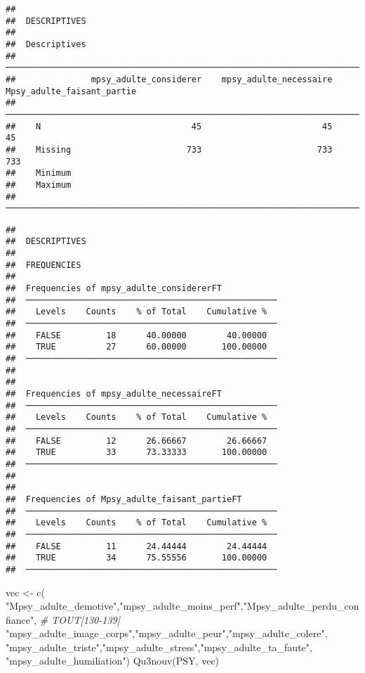 \documentclass[
]{article}
\newenvironment{Shaded}{\begin{snugshade}}{\end{snugshade}}
\newcommand{\CommentTok}[1]{\textcolor[rgb]{0.56,0.35,0.01}{\textit{#1}}}
\newcommand{\FunctionTok}[1]{\textcolor[rgb]{0.00,0.00,0.00}{#1}}
\newcommand{\NormalTok}[1]{#1}
\newcommand{\OtherTok}[1]{\textcolor[rgb]{0.56,0.35,0.01}{#1}}
\newcommand{\StringTok}[1]{\textcolor[rgb]{0.31,0.60,0.02}{#1}}
\begin{document}
\begin{verbatim}
## 
##  DESCRIPTIVES
## 
##  Descriptives                                                                                  
##  ───────────────────────────────────────────────────────────────────────────────────────────── 
##               mpsy_adulte_considerer    mpsy_adulte_necessaire    Mpsy_adulte_faisant_partie   
##  ───────────────────────────────────────────────────────────────────────────────────────────── 
##    N                              45                        45                            45   
##    Missing                       733                       733                           733   
##    Minimum                                                                                     
##    Maximum                                                                                     
##  ─────────────────────────────────────────────────────────────────────────────────────────────
\end{verbatim}

\begin{verbatim}
## 
##  DESCRIPTIVES
## 
##  FREQUENCIES
## 
##  Frequencies of mpsy_adulte_considererFT            
##  ────────────────────────────────────────────────── 
##    Levels    Counts    % of Total    Cumulative %   
##  ────────────────────────────────────────────────── 
##    FALSE         18      40.00000        40.00000   
##    TRUE          27      60.00000       100.00000   
##  ────────────────────────────────────────────────── 
## 
## 
##  Frequencies of mpsy_adulte_necessaireFT            
##  ────────────────────────────────────────────────── 
##    Levels    Counts    % of Total    Cumulative %   
##  ────────────────────────────────────────────────── 
##    FALSE         12      26.66667        26.66667   
##    TRUE          33      73.33333       100.00000   
##  ────────────────────────────────────────────────── 
## 
## 
##  Frequencies of Mpsy_adulte_faisant_partieFT        
##  ────────────────────────────────────────────────── 
##    Levels    Counts    % of Total    Cumulative %   
##  ────────────────────────────────────────────────── 
##    FALSE         11      24.44444        24.44444   
##    TRUE          34      75.55556       100.00000   
##  ──────────────────────────────────────────────────
\end{verbatim}

\begin{Shaded}
\begin{Highlighting}[]
\NormalTok{vec }\OtherTok{\textless{}{-}} \FunctionTok{c}\NormalTok{( }\StringTok{"Mpsy\_adulte\_demotive"}\NormalTok{,}\StringTok{"mpsy\_adulte\_moins\_perf"}\NormalTok{,}\StringTok{"Mpsy\_adulte\_perdu\_confiance"}\NormalTok{,  }\CommentTok{\# TOUT[130{-}139]}
     \StringTok{"mpsy\_adulte\_image\_corps"}\NormalTok{,}\StringTok{"mpsy\_adulte\_peur"}\NormalTok{,}\StringTok{"mpsy\_adulte\_colere"}\NormalTok{,}
     \StringTok{"mpsy\_adulte\_triste"}\NormalTok{,}\StringTok{"mpsy\_adulte\_stress"}\NormalTok{,}\StringTok{"mpsy\_adulte\_ta\_faute"}\NormalTok{,}
     \StringTok{"mpsy\_adulte\_humiliation"}\NormalTok{)}
\FunctionTok{Qu3nouv}\NormalTok{(PSY, vec)}
\end{Highlighting}
\end{Shaded}
\end{document}

